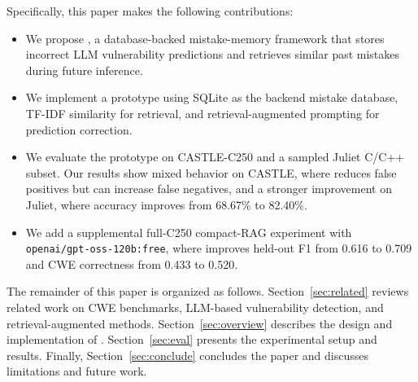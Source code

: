 Specifically, this paper makes the following contributions:
\begin{itemize}
    \item We propose \system, a database-backed mistake-memory framework that stores incorrect LLM vulnerability predictions and retrieves similar past mistakes during future inference.
    \item We implement a prototype using SQLite as the backend mistake database, TF-IDF similarity for retrieval, and retrieval-augmented prompting for prediction correction.
    \item We evaluate the prototype on CASTLE-C250 and a sampled Juliet C/C++ subset. Our results show mixed behavior on CASTLE, where \system reduces false positives but can increase false negatives, and a stronger improvement on Juliet, where accuracy improves from 68.67\% to 82.40\%.
    \item We add a supplemental full-C250 compact-RAG experiment with \texttt{openai/gpt-oss-120b:free}, where \system improves held-out F1 from 0.616 to 0.709 and CWE correctness from 0.433 to 0.520.
\end{itemize}

The remainder of this paper is organized as follows. Section~\ref{sec:related} reviews related work on CWE benchmarks, LLM-based vulnerability detection, and retrieval-augmented methods. Section~\ref{sec:overview} describes the design and implementation of \system. Section~\ref{sec:eval} presents the experimental setup and results. Finally, Section~\ref{sec:conclude} concludes the paper and discusses limitations and future work.
